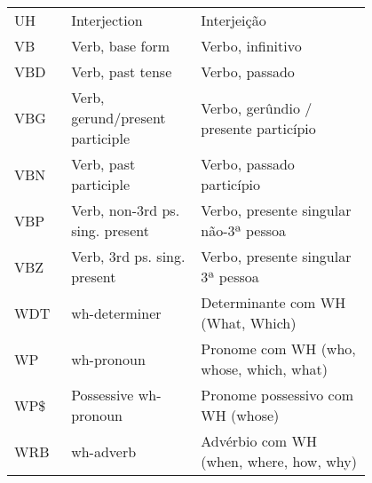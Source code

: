 \begin{longtable}{|p{0.1\linewidth}|p{0.3\linewidth}|p{0.4\linewidth}|}
        UH & Interjection & Interjeição\\
        VB & Verb, base form & Verbo, infinitivo\\
        VBD & Verb, past tense & Verbo, passado\\
        VBG & Verb, gerund/present participle & Verbo, gerûndio / presente particípio\\
        VBN & Verb, past participle & Verbo, passado particípio\\
        VBP & Verb, non-3rd ps. sing. present & Verbo, presente singular não-3ª pessoa\\
        VBZ & Verb, 3rd ps. sing. present & Verbo, presente singular 3ª pessoa\\
        WDT & wh-determiner & Determinante com WH (What, Which)\\
        WP & wh-pronoun & Pronome com WH (who, whose, which, what)\\
        WP\$ & Possessive wh-pronoun & Pronome possessivo com WH (whose)\\
        WRB & wh-adverb & Advérbio com WH (when, where, how, why)
\end{longtable}
\label{tab:tags_ptb}